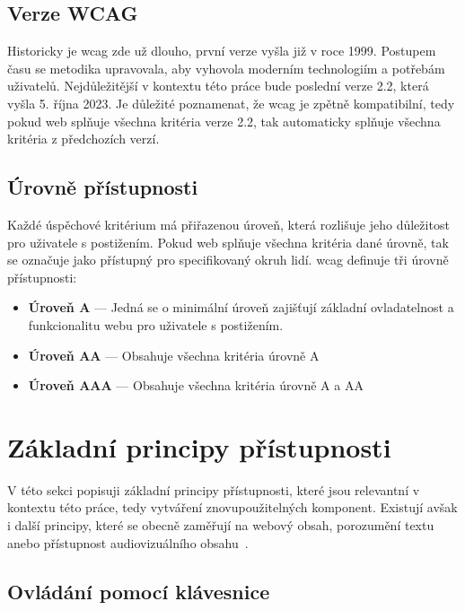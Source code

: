 \subsection{Verze WCAG}

Historicky je \gls{wcag} zde už dlouho, první verze vyšla již v roce 1999.
Postupem času se metodika upravovala, aby vyhovola moderním technologiím a potřebám uživatelů.
Nejdůležitější v kontextu této práce bude poslední verze 2.2, která vyšla 5. října 2023.
Je důležité poznamenat, že \gls{wcag} je zpětně kompatibilní, tedy pokud web splňuje všechna kritéria verze 2.2, tak automaticky splňuje všechna kritéria z předchozích verzí.

\subsection{Úrovně přístupnosti}

Každé úspěchové kritérium má přiřazenou úroveň, která rozlišuje jeho důležitost pro uživatele s postižením.
Pokud web splňuje všechna kritéria dané úrovně, tak se označuje jako přístupný pro specifikovaný okruh lidí.
\gls{wcag} definuje tři úrovně přístupnosti:

\begin{itemize}
  \item \textbf{Úroveň A} --- Jedná se o minimální úroveň zajišťují základní ovladatelnost a funkcionalitu webu pro uživatele s postižením.
  \item \textbf{Úroveň AA} --- Obsahuje všechna kritéria úrovně A
  \item \textbf{Úroveň AAA} --- Obsahuje všechna kritéria úrovně A a AA
\end{itemize}

\section{Základní principy přístupnosti}


V této sekci popisuji základní principy přístupnosti, které jsou relevantní v kontextu této práce, tedy vytváření znovupoužitelných komponent.
Existují avšak i další principy, které se obecně zaměřují na webový obsah, porozumění textu anebo přístupnost audiovizuálního obsahu~\cite{w3-accessibility-principles}.

\subsection{Ovládání pomocí klávesnice}

